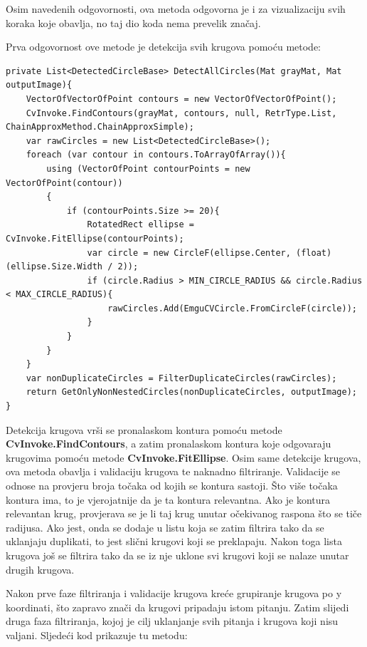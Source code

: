 \documentclass{foi}
\begin{document}
Osim navedenih odgovornosti, ova metoda odgovorna je i za vizualizaciju svih koraka koje obavlja, no taj dio koda nema prevelik značaj.

Prva odgovornost ove metode je detekcija svih krugova pomoću metode:

\begin{lstlisting}[caption={Metoda za detektciju svih krugova na slici}]
private List<DetectedCircleBase> DetectAllCircles(Mat grayMat, Mat outputImage){
    VectorOfVectorOfPoint contours = new VectorOfVectorOfPoint();
    CvInvoke.FindContours(grayMat, contours, null, RetrType.List, ChainApproxMethod.ChainApproxSimple);
    var rawCircles = new List<DetectedCircleBase>();
    foreach (var contour in contours.ToArrayOfArray()){
        using (VectorOfPoint contourPoints = new VectorOfPoint(contour))
        {
            if (contourPoints.Size >= 20){
                RotatedRect ellipse = CvInvoke.FitEllipse(contourPoints);
                var circle = new CircleF(ellipse.Center, (float)(ellipse.Size.Width / 2));
                if (circle.Radius > MIN_CIRCLE_RADIUS && circle.Radius < MAX_CIRCLE_RADIUS){
                    rawCircles.Add(EmguCVCircle.FromCircleF(circle));
                }
            }
        }
    }
    var nonDuplicateCircles = FilterDuplicateCircles(rawCircles);
    return GetOnlyNonNestedCircles(nonDuplicateCircles, outputImage);
}
\end{lstlisting}

Detekcija krugova vrši se pronalaskom kontura pomoću metode \textbf{CvInvoke.FindContours}, a zatim pronalaskom kontura koje odgovaraju krugovima pomoću metode \textbf{CvInvoke.FitEllipse}. Osim same detekcije krugova, ova metoda obavlja i validaciju krugova te naknadno filtriranje. Validacije se odnose na provjeru broja točaka od kojih se kontura sastoji. Što više točaka kontura ima, to je vjerojatnije da je ta kontura relevantna. Ako je kontura relevantan krug, provjerava se je li taj krug unutar očekivanog raspona što se tiče radijusa. Ako jest, onda se dodaje u listu koja se zatim filtrira tako da se uklanjaju duplikati, to jest slični krugovi koji se preklapaju. Nakon toga lista krugova još se filtrira tako da se iz nje uklone svi krugovi koji se nalaze unutar drugih krugova.


\pagebreak
Nakon prve faze filtriranja i validacije krugova kreće grupiranje krugova po y koordinati, što zapravo znači da krugovi pripadaju istom pitanju. Zatim slijedi druga faza filtriranja, kojoj je cilj uklanjanje svih pitanja i krugova koji nisu valjani. Sljedeći kod prikazuje tu metodu:
\end{document}
